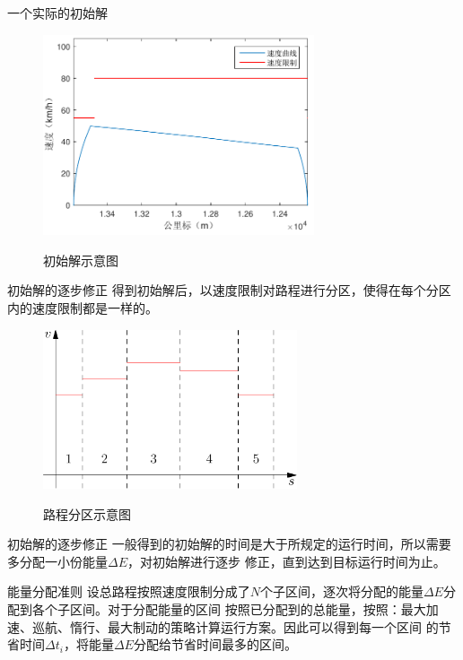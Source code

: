 \documentclass{beamer}
\begin{document}
\begin{frame}{一个实际的初始解}
\begin{figure}
  \centering
  \includegraphics[width=8cm]{fig/fig7/fig7.pdf}\\
  \caption{初始解示意图}
\end{figure}

\end{frame}

\begin{frame}{初始解的逐步修正}
得到初始解后，以速度限制对路程进行分区，使得在每个分区内的速度限制都是一样的。
\begin{figure}
  \centering
  \includegraphics[width=7.5cm]{fig/fig8/fig8.pdf}\\
  \caption{路程分区示意图}
\end{figure}

\end{frame}

\begin{frame}{初始解的逐步修正}
一般得到的初始解的时间是大于所规定的运行时间，所以需要多分配一小份能量$\Delta E$，对初始解进行逐步
修正，直到达到目标运行时间为止。

\begin{block}{能量分配准则}
设总路程按照速度限制分成了$N$个子区间，逐次将分配的能量$\Delta E$分配到各个子区间。对于分配能量的区间
按照已分配到的总能量，按照：最大加速、巡航、惰行、最大制动的策略计算运行方案。因此可以得到每一个区间
的节省时间$\Delta t_i$，将能量$\Delta E$分配给节省时间最多的区间。
\end{block}
\end{frame}
\end{document}
